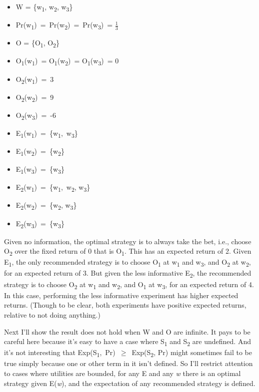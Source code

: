 \documentclass[
  12pt,
  letterpaper,
  DIV=11,
  numbers=noendperiod]{scrartcl}
\providecommand{\tightlist}{%
  \setlength{\itemsep}{0pt}\setlength{\parskip}{0pt}}\usepackage{longtable,booktabs,array}
\begin{document}
\begin{itemize}
\tightlist
\item
  W = \{w\textsubscript{1}, w\textsubscript{2}, w\textsubscript{3}\}
\item
  Pr(w\textsubscript{1})~=~Pr(w\textsubscript{2})~=~Pr(w\textsubscript{3})~=
  $\frac{1}{3}$
\item
  O = \{O\textsubscript{1}, O\textsubscript{2}\}
\item
  O\textsubscript{1}(w\textsubscript{1})~=
  O\textsubscript{1}(w\textsubscript{2})~=
  O\textsubscript{1}(w\textsubscript{3})~= 0
\item
  O\textsubscript{2}(w\textsubscript{1})~=~3
\item
  O\textsubscript{2}(w\textsubscript{2})~=~9
\item
  O\textsubscript{2}(w\textsubscript{3})~=~-6
\item
  E\textsubscript{1}(w\textsubscript{1})~=~\{w\textsubscript{1},~w\textsubscript{3}\}
\item
  E\textsubscript{1}(w\textsubscript{2})~=~\{w\textsubscript{2}\}
\item
  E\textsubscript{1}(w\textsubscript{3})~=~\{w\textsubscript{3}\}
\item
  E\textsubscript{2}(w\textsubscript{1})~=~\{w\textsubscript{1},~w\textsubscript{2},
  w\textsubscript{3}\}
\item
  E\textsubscript{2}(w\textsubscript{2})~=~\{w\textsubscript{2},
  w\textsubscript{3}\}
\item
  E\textsubscript{2}(w\textsubscript{3})~=~\{w\textsubscript{3}\}
\end{itemize}

Given no information, the optimal strategy is to always take the bet,
i.e., choose O\textsubscript{2} over the fixed return of 0 that is
O\textsubscript{1}. This has an expected return of 2. Given
E\textsubscript{1}, the only recommended strategy is to choose
O\textsubscript{1} at w\textsubscript{1} and w\textsubscript{3}, and
O\textsubscript{2} at w\textsubscript{2}, for an expected return of 3.
But given the less informative E\textsubscript{2}, the recommended
strategy is to choose O\textsubscript{2} at w\textsubscript{1} and
w\textsubscript{2}, and O\textsubscript{1} at w\textsubscript{3}, for an
expected return of 4. In this case, performing the less informative
experiment has higher expected returns. (Though to be clear, both
experiments have positive expected returns, relative to not doing
anything.)

Next I'll show the result does not hold when W and O are infinite. It
pays to be careful here because it's easy to have a case where
S\textsubscript{1} and S\textsubscript{2} are undefined. And it's not
interesting that Exp(S\textsubscript{1},~Pr)~$\geq$~Exp(S\textsubscript{2},
Pr) might sometimes fail to be true simply because one or other term in
it isn't defined. So I'll restrict attention to cases where utilities
are bounded, for any E and any \emph{w} there is an optimal strategy
given E(\emph{w}), and the expectation of any recommended strategy is
defined.
\end{document}
